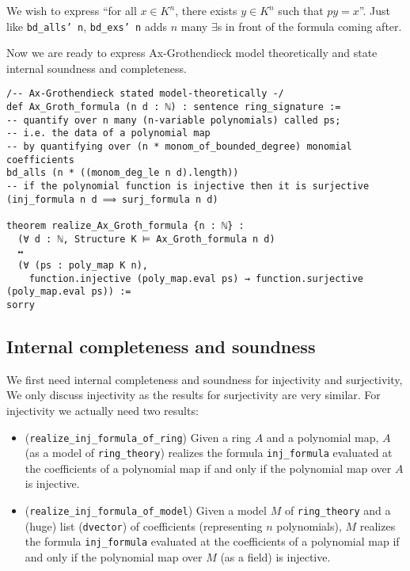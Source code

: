 We wish to express ``for all $x \in K^{n}$, there exists $y \in K^{n}$ such that $p y = x$''.
Just like \texttt{bd\_alls' n}, \texttt{bd\_exs' n} adds $n$ many $\exists$s in front of the
formula coming after.

Now we are ready to express Ax-Grothendieck model theoretically and state internal
soundness and completeness.

\begin{lstlisting}
/-- Ax-Grothendieck stated model-theoretically -/
def Ax_Groth_formula (n d : ℕ) : sentence ring_signature :=
-- quantify over n many (n-variable polynomials) called ps;
-- i.e. the data of a polynomial map
-- by quantifying over (n * monom_of_bounded_degree) monomial coefficients
bd_alls (n * ((monom_deg_le n d).length))
-- if the polynomial function is injective then it is surjective
(inj_formula n d ⟹ surj_formula n d)

theorem realize_Ax_Groth_formula {n : ℕ} :
  (∀ d : ℕ, Structure K ⊨ Ax_Groth_formula n d)
  ↔
  (∀ (ps : poly_map K n),
    function.injective (poly_map.eval ps) → function.surjective (poly_map.eval ps)) :=
sorry
\end{lstlisting}

\subsection{Internal completeness and soundness}

We first need internal completeness and soundness for injectivity and surjectivity,
We only discuss injectivity as the results for surjectivity are very similar.
For injectivity we actually need two results:
\begin{itemize}
  \item (\texttt{realize\_inj\_formula\_of\_ring})
    Given a ring $A$ and a polynomial map,
    $A$ (as a model of \texttt{ring\_theory})
    realizes the formula \texttt{inj\_formula} evaluated at the coefficients
    of a polynomial map if and only if the polynomial map over $A$ is injective.
  \item (\texttt{realize\_inj\_formula\_of\_model})
    Given a model $M$ of \texttt{ring\_theory} and a (huge) list
    (\texttt{dvector}) of coefficients (representing $n$ polynomials),
    $M$ realizes the formula
    \texttt{inj\_formula} evaluated at the coefficients of a polynomial map
    if and only if the polynomial map over $M$ (as a field) is injective.
\end{itemize}

